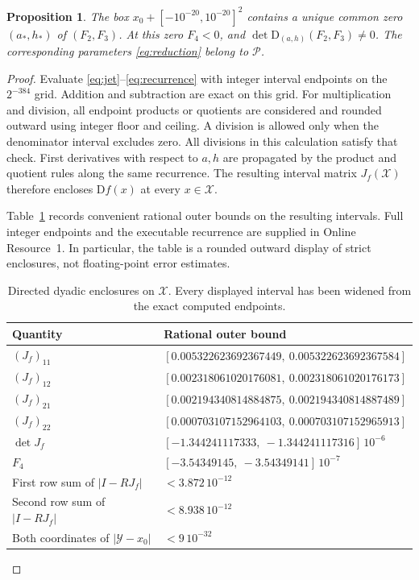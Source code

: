\documentclass[11pt,a4paper]{article}
\newtheorem{proposition}[theorem]{Proposition}
\theoremstyle{remark}
\newcommand{\D}{\mathrm D}
\numberwithin{equation}{section}
\begin{document}
\begin{proposition}\label{prop:certificate}
The box $x_0+[-10^{-20},10^{-20}]^2$ contains a unique common zero
$(a_*,h_*)$ of $(F_2,F_3)$. At this zero $F_4<0$, and
$\det\D_{(a,h)}(F_2,F_3)\ne0$. The corresponding parameters
\eqref{eq:reduction} belong to $\mathcal P$.
\end{proposition}

\begin{proof}
Evaluate \eqref{eq:jet}--\eqref{eq:recurrence} with integer interval
endpoints on the $2^{-384}$ grid. Addition and subtraction are exact on
this grid. For multiplication and division, all endpoint products or
quotients are considered and rounded outward using integer floor and
ceiling. A division is allowed only when the denominator interval
excludes zero. All divisions in this calculation satisfy that check.
First derivatives with respect to $a,h$ are propagated by the product
and quotient rules along the same recurrence. The resulting interval
matrix $J_f(\mathcal X)$ therefore encloses $\D f(x)$ at every
$x\in\mathcal X$.

Table~\ref{tab:certificate} records convenient rational outer bounds
on the resulting intervals. Full integer endpoints and the executable
recurrence are supplied in Online Resource~1. In particular, the table
is a rounded outward display of strict enclosures, not floating-point
error estimates.
\begin{table}[htbp]
\centering
\caption{Directed dyadic enclosures on $\mathcal X$. Every displayed
interval has been widened from the exact computed endpoints.}
\label{tab:certificate}
\small
\begin{tabular}{@{}ll@{}}
\toprule
Quantity & Rational outer bound\\
\midrule
$(J_f)_{11}$ & $[0.005322623692367449,\ 0.005322623692367584]$\\
$(J_f)_{12}$ & $[0.002318061020176081,\ 0.002318061020176173]$\\
$(J_f)_{21}$ & $[0.002194340814884875,\ 0.002194340814887489]$\\
$(J_f)_{22}$ & $[0.000703107152964103,\ 0.000703107152965913]$\\
$\det J_f$ & $[-1.344241117333,\ -1.344241117316]\,10^{-6}$\\
$F_4$ & $[-3.54349145,\ -3.54349141]\,10^{-7}$\\
First row sum of $|I-RJ_f|$ & $<3.872\,10^{-12}$\\
Second row sum of $|I-RJ_f|$ & $<8.938\,10^{-12}$\\
Both coordinates of $|\mathcal Y-x_0|$ & $<9\,10^{-32}$\\
\bottomrule
\end{tabular}
\end{table}


\end{proof}
\end{document}
